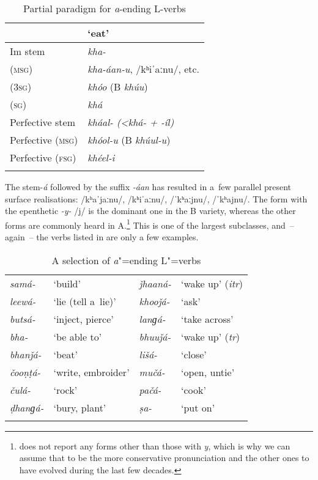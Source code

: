\begin{table}
\caption{Partial paradigm for \textit{a}-ending L-verbs}
\begin{tabularx}{.75\textwidth}{ Q Q }
\lsptoprule
&
`eat'\\\midrule
Im stem &
\textit{kha-} \\
 (\textsc{msg}) &
\textit{kha-áan-u}, /kʰiˈaːnu/, etc.\\
 (\textsc{3sg}) &
\textit{khóo} (B \textit{khúu})\\
 (\textsc{sg}) &
\textit{khá} \\
Perfective stem &
\textit{kháal- ({\textless}khá- + -íl)}\\
Perfective (\textsc{msg}) &
\textit{khóol-u} (B \textit{khúul-u})\\
Perfective (\textsc{fsg}) &
\textit{khéel-i} \\\lspbottomrule
\end{tabularx}
\label{tab:8-5}
\end{table}


The stem-\textit{á} followed by the suffix \textit{-áan} has resulted in a~few parallel present  surface realisations: /kʰaˈjaːnu/, /kʰiˈaːnu/, /ˈkʰaːjnu/, /ˈkʰajnu/. The form with the epenthetic \textit{-y-} /j/ is the dominant one in the B variety, whereas the other forms are commonly heard in A.\footnote{\citet[22]{morgenstierne1941} does not report any forms other than those with \textit{y}, which is why we can assume that to be the more conservative pronunciation and the other ones to have evolved during the last few decades.} This is one of the largest subclasses, and~-- again~-- the verbs listed in  are only a few examples.


\begin{table}[h]
\caption{A selection of \textit{a}"=ending L"=verbs}
\begin{tabularx}{\textwidth}{ l@{\hspace{20pt}} Q l@{\hspace{20pt}} Q }
\lsptoprule
\textit{samá-} &
`build' &
\textit{ǰhaaná-} &
`wake up' (\textit{itr})\\
\textit{leewá-} &
`lie (tell a~lie)' &
\textit{khooǰá-} &
`ask'\\
\textit{butsá-} &
`inject, pierce' &
\textit{lanɡá-} &
`take across'\\
\textit{bha-} &
`be able to' &
\textit{bhuuǰá-} &
`wake up' (\textit{tr})\\
\textit{bhanǰá-} &
`beat' &
\textit{lišá-} &
`close'\\
\textit{čooṇṭá-} &
`write, embroider' &
\textit{mučá-} &
`open, untie'\\
\textit{čulá-} &
`rock' &
\textit{pačá-} &
`cook'\\
\textit{ḍhanɡá-} &
`bury, plant' &
\textit{ṣa-} &
`put on'\\\lspbottomrule
\end{tabularx}
\label{tab:8-la}
\end{table}

